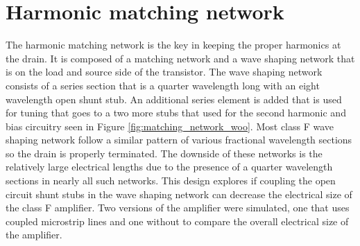 


\section{Harmonic matching network}

The harmonic matching network is the key in keeping the proper harmonics at the drain. It is composed of a matching network and a wave shaping network that is on the load and source side of the transistor. The wave shaping network consists of a series section that is a quarter wavelength long with an eight wavelength open shunt stub. An additional series element is added that is used for tuning that goes to a two more stubs that used for the second harmonic and bias circuitry seen in Figure \ref{fig:matching_network_woo}. Most class F wave shaping network follow a similar pattern of various fractional wavelength sections so the drain is properly terminated. The downside of these networks is the relatively large electrical lengths due to the presence of a quarter wavelength sections in nearly all such networks. This design explores if coupling the open circuit shunt stubs in the wave shaping network can decrease the electrical size of the class F amplifier. Two versions of the amplifier were simulated, one that uses coupled microstrip lines and one without to compare the overall electrical size of the amplifier.

